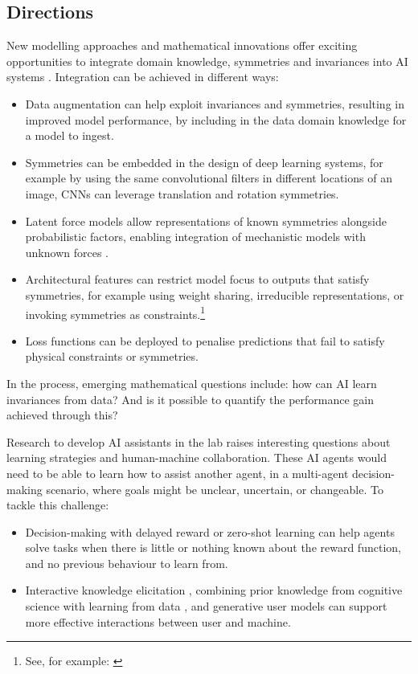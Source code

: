 \subsection{Directions}\label{directions-2}

New modelling approaches and mathematical innovations offer exciting
opportunities to integrate domain knowledge, symmetries and invariances
into AI systems \cite{Villar-dimensionless22}.
Integration can be achieved in different ways:

\begin{itemize}
\item
  Data augmentation can help exploit invariances and symmetries,
  resulting in improved model performance, by including in the data
  domain knowledge for a model to ingest.
\item
  Symmetries can be embedded in the design of deep learning systems, for
  example by using the same convolutional filters in different locations
  of an image, CNNs can leverage translation and rotation symmetries.
\item
  Latent force models allow representations of known symmetries
  alongside probabilistic factors, enabling integration of mechanistic
  models with unknown forces \cite{Ward-blackbox20}.
\item
  Architectural features can restrict model focus to outputs that
  satisfy symmetries, for example using weight sharing, irreducible
  representations, or invoking symmetries as constraints.\footnote{See,
    for example: \cite{Kondor-generalization18,Maron-invariant18,Dym-universality20}}
\item
  Loss functions can be deployed to penalise predictions that fail to
  satisfy physical constraints or symmetries.
\end{itemize}

In the process, emerging mathematical questions include: how can AI
learn invariances from data? And is it possible to quantify the
performance gain achieved through this?

Research to develop AI assistants in the lab raises interesting
questions about learning strategies and human-machine collaboration.
These AI agents would need to be able to learn how to assist another
agent, in a multi-agent decision-making scenario, where goals might be
unclear, uncertain, or changeable. To tackle this challenge:

\begin{itemize}
\item
  Decision-making with delayed reward or zero-shot learning can help
  agents solve tasks when there is little or nothing known about the
  reward function, and no previous behaviour to learn from.
\item
  Interactive knowledge elicitation \cite{Sundin-improving18},
  combining prior knowledge from cognitive science with learning from
  data \cite{Kangasraasio-parameter19},
  and generative user models \cite{DePeuter-toward21}
  can support more effective interactions between user and machine.
\end{itemize}

